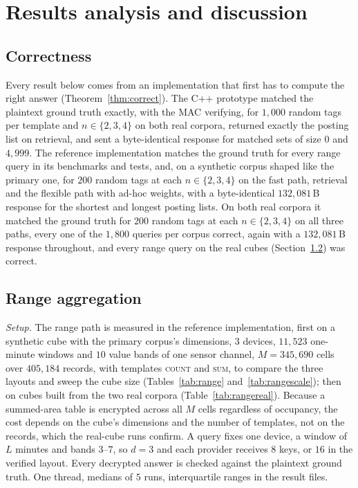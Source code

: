 \documentclass[a4paper,fleqn]{cas-sc}
\begin{document}
\section{Results analysis and discussion}
\label{sec:resultsdisc}

\subsection{Correctness}
\label{sec:correctness}
Every result below comes from an implementation that first has to compute the
right answer (Theorem~\ref{thm:correct}). The C++ prototype matched the plaintext ground truth exactly, with
the MAC verifying, for $1{,}000$ random tags per template and $n\in\{2,3,4\}$ on
both real corpora, returned exactly the posting list on retrieval, and sent a
byte-identical response for matched sets of size $0$ and $4{,}999$. The
reference implementation matches the ground truth for every range query in its
benchmarks and tests, and, on a synthetic corpus shaped like the primary one,
for $200$ random tags at each $n\in\{2,3,4\}$ on the fast path, retrieval and
the flexible path with ad-hoc weights, with a byte-identical $132{,}081$\,B
response for the shortest and longest posting lists. On both real corpora it
matched the ground truth for $200$ random tags at each $n\in\{2,3,4\}$ on all
three paths, every one of the $1{,}800$ queries per corpus correct, again with
a $132{,}081$\,B response throughout, and every range query on the real cubes
(Section~\ref{sec:rangeresult}) was correct.


\subsection{Range aggregation}
\label{sec:rangeresult}
\emph{Setup.} The range path is measured in the reference implementation,
first on a synthetic cube with the primary corpus's dimensions, $3$ devices,
$11{,}523$ one-minute windows and $10$ value bands of one sensor channel,
$M=345{,}690$ cells over $405{,}184$ records, with templates \textsc{count}
and \textsc{sum}, to compare the three layouts and sweep the cube size
(Tables~\ref{tab:range} and~\ref{tab:rangescale}); then on cubes built from
the two real corpora (Table~\ref{tab:rangereal}). Because a summed-area table
is encrypted across all $M$ cells regardless of occupancy, the cost depends on
the cube's dimensions and the number of templates, not on the records, which
the real-cube runs confirm. A query fixes one device, a window of $L$ minutes
and bands $3$--$7$, so $d=3$ and each provider receives $8$ keys, or $16$ in
the verified layout. Every decrypted answer is checked against the plaintext
ground truth. One thread, medians of $5$ runs, interquartile ranges in the
result files.
\end{document}
